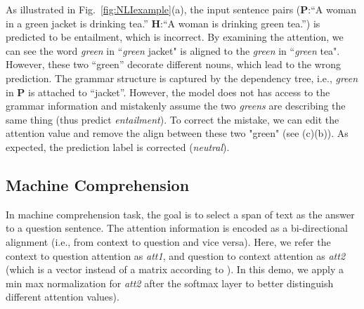 As illustrated in Fig.~\ref{fig:NLIexample}(a), the input sentence pairs (\textbf{P}:``A woman in a green jacket is drinking tea.'' \textbf{H}:``A woman is drinking green tea.'') is predicted to be entailment, which is incorrect.
By examining the attention, we can see the word \emph{green} in ``\emph{green} jacket" is aligned to the \emph{green} in ``\emph{green} tea". However, these two ``green'' decorate different nouns, which lead to the wrong prediction. The grammar structure is captured by the dependency tree, i.e., \emph{green} in \textbf{P} is attached to ``jacket''. However, the model does not has access to the grammar information and mistakenly assume the two \emph{greens} are describing the same thing (thus predict \emph{entailment}). 
%
To correct the mistake, we can edit the attention value and remove the align between these two "green" (see (c)(b)).
As expected, the prediction label is corrected (\emph{neutral}).

\subsection{Machine Comprehension}
\label{sec:MCexample}
In machine comprehension task, the goal is to select a span of text as the answer
to a question sentence.
The attention information is encoded as a bi-directional alignment (i.e., from context to question and vice versa). 
Here, we refer the context to question attention as \emph{att1}, and question to context attention as \emph{att2} (which is a vector instead of a matrix according to \citet{Seo2016}). In this demo, we apply a min max normalization for \emph{att2} after the softmax layer to better distinguish different attention values).

